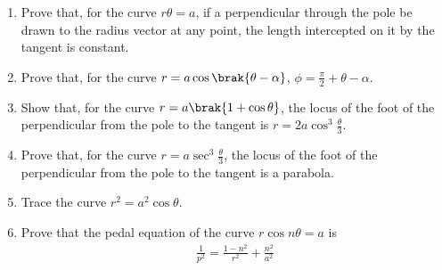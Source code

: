 \begin{enumerate}[1.]
\item Prove that, for the curve $r\theta = a$, if a perpendicular through the pole be drawn
to the radius vector at any point, the length intercepted on it by the tangent
is constant.  
\item Prove that, for the curve $r = a \cos\brak{\theta-\alpha}$, $\phi = +\theta-\alpha$.
\item Show that, for the curve $r = a$, the locus of the foot of the perpendicular from the pole to the tangent is 
$r = 2a\cos^3$.
\item Prove that, for the curve $r = a\sec^3$, the locus of the foot of the perpendicular from the pole to the tangent
is a parabola.
\item Trace the curve $r^2=a^2\cos\theta$.
\item Prove that the pedal equation of the curve $r\cos n\theta = a$ is
\begin{align*}
\frac{1}{p^2} = \frac{1-n^2}{r^2}+\frac{n^2}{a^2}
\end{align*}
\end{enumerate}